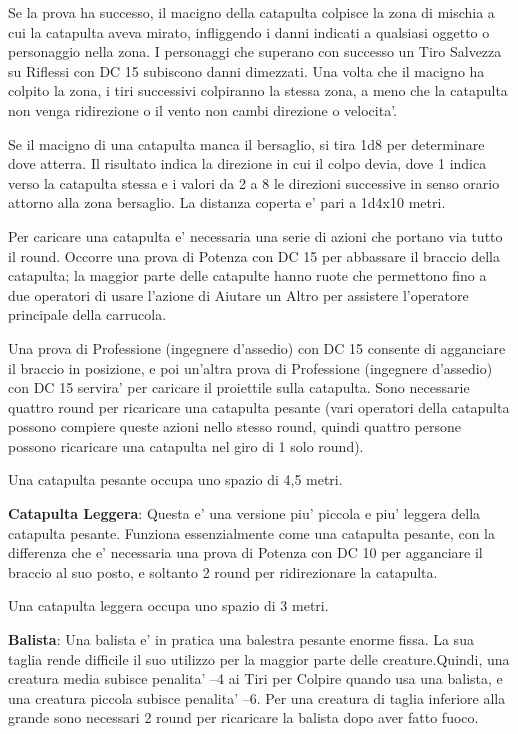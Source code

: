 \documentclass[a4paper,11pt,twoside,openany]{book}
\begin{document}
{		Se la prova ha successo, il macigno della catapulta colpisce la zona di mischia a cui la catapulta aveva mirato, infliggendo i danni indicati a qualsiasi oggetto o personaggio nella zona. I personaggi che superano con successo un Tiro Salvezza su Riflessi con DC 15 subiscono danni dimezzati. Una volta che il macigno ha colpito la zona, i tiri successivi colpiranno la stessa zona, a meno che la catapulta non venga ridirezione o il vento non cambi direzione o velocita'.
		
		Se il macigno di una catapulta manca il bersaglio, si tira 1d8 per determinare dove atterra. Il risultato indica la direzione in cui il colpo devia, dove 1 indica verso la catapulta stessa e i valori da 2 a 8 le direzioni successive in senso orario attorno alla zona bersaglio. La distanza coperta e' pari a 1d4x10 metri.
		
		Per caricare una catapulta e' necessaria una serie di azioni che portano via tutto il round. Occorre una prova di Potenza con DC 15 per abbassare il braccio della catapulta; la maggior parte delle catapulte hanno ruote che permettono fino a due operatori di usare l'azione di Aiutare un Altro per assistere l'operatore principale della carrucola.
		
		Una prova di Professione (ingegnere d'assedio) con DC 15 consente di agganciare il braccio in posizione, e poi un'altra prova di Professione (ingegnere d'assedio) con DC 15 servira' per caricare il proiettile sulla catapulta. Sono necessarie quattro round per ricaricare una catapulta pesante (vari operatori della catapulta possono compiere queste azioni nello stesso round, quindi quattro persone possono ricaricare una catapulta nel giro di 1 solo round).
		
		Una catapulta pesante occupa uno spazio di 4,5 metri.
		
		\textbf{Catapulta Leggera}: Questa e' una versione piu' piccola e piu' leggera della catapulta pesante. Funziona essenzialmente come una catapulta pesante, con la differenza che e' necessaria una prova di Potenza con DC 10 per agganciare il braccio al suo posto, e soltanto 2 round per ridirezionare la catapulta.
		
		Una catapulta leggera occupa uno spazio di 3 metri.
		
		\textbf{Balista}: Una balista e' in pratica una balestra pesante enorme fissa. La sua taglia rende difficile il suo utilizzo per la maggior parte delle creature.Quindi, una creatura media subisce penalita' --4 ai Tiri per Colpire quando usa una balista, e una creatura piccola subisce penalita' --6. Per una creatura di taglia inferiore alla grande sono necessari 2 round per ricaricare la balista dopo aver fatto fuoco.
		
}
\end{document}

